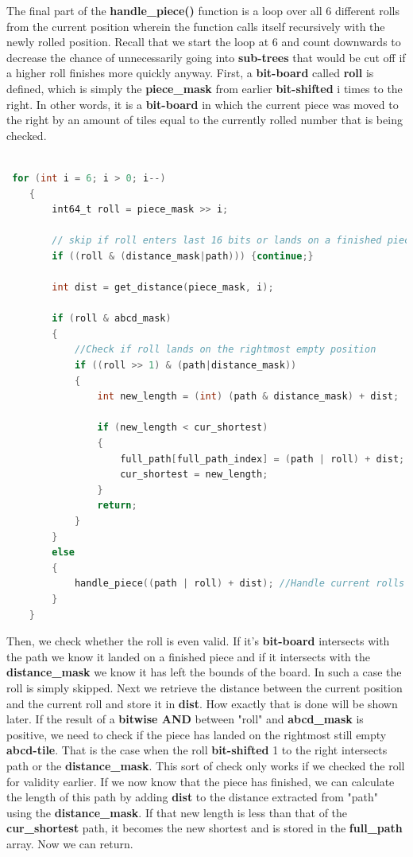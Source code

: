 \documentclass[12pt]{article}
\begin{document}
The final part of the \textbf{handle\_piece()} function is a loop over all 6 different rolls from the current position wherein the function calls itself recursively with the newly rolled position. Recall that we start the loop at 6 and count downwards to decrease the chance of unnecessarily going into \textbf{sub-trees} that would be cut off if a higher roll finishes more quickly anyway.
First, a \textbf{bit-board} called \textbf{roll} is defined, which is simply the \textbf{piece\_mask} from earlier \textbf{bit-shifted} i times to the right. In other words, it is a \textbf{bit-board} in which the current piece was moved to the right by an amount of tiles equal to the currently rolled number that is being checked.

\begin{lstlisting}[language=C, caption={Roll loop}, label={lst:roll-loop}]

 for (int i = 6; i > 0; i--)
    {
        int64_t roll = piece_mask >> i;

        // skip if roll enters last 16 bits or lands on a finished piece
        if ((roll & (distance_mask|path))) {continue;}

        int dist = get_distance(piece_mask, i);

        if (roll & abcd_mask)
        {
            //Check if roll lands on the rightmost empty position
            if ((roll >> 1) & (path|distance_mask))
            {
                int new_length = (int) (path & distance_mask) + dist;

                if (new_length < cur_shortest)
                {
                    full_path[full_path_index] = (path | roll) + dist;
                    cur_shortest = new_length;
                }
                return;
            }
        }
        else
        {
            handle_piece((path | roll) + dist); //Handle current rolls subtree
        }
    }

\end{lstlisting}

Then, we check whether the roll is even valid. If it's \textbf{bit-board} intersects with the path we know it landed on a finished piece and if it intersects with the \textbf{distance\_mask} we know it has left the bounds of the board. In such a case the roll is simply skipped.
Next we retrieve the distance between the current position and the current roll and store it in \textbf{dist}. How exactly that is done will be shown later. If the result of a \textbf{bitwise AND} between "roll" and \textbf{abcd\_mask} is positive, we need to check if the piece has landed on the rightmost still empty \textbf{abcd-tile}. That is the case when the roll \textbf{bit-shifted} 1 to the right intersects path or the \textbf{distance\_mask}. This sort of check only works if we checked the roll for validity earlier. If we now know that the piece has finished, we can calculate the length of this path by adding \textbf{dist} to the distance extracted from "path" using the \textbf{distance\_mask}. If that new length is less than that of the \textbf{cur\_shortest} path, it becomes the new shortest and is stored in the \textbf{full\_path} array. Now we can return.
\end{document}
